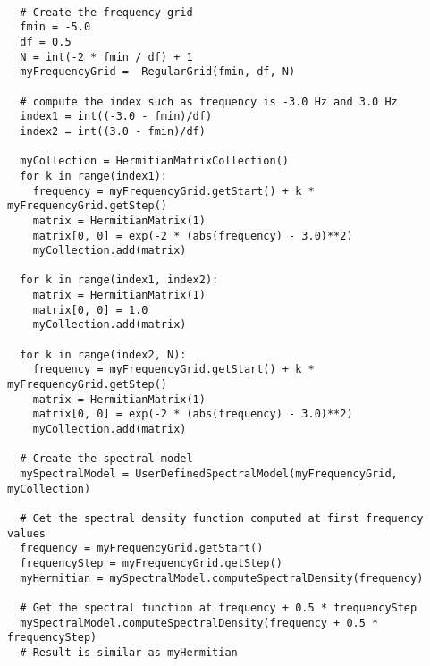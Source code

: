 \begin{lstlisting}

  # Create the frequency grid
  fmin = -5.0
  df = 0.5
  N = int(-2 * fmin / df) + 1
  myFrequencyGrid =  RegularGrid(fmin, df, N)

  # compute the index such as frequency is -3.0 Hz and 3.0 Hz
  index1 = int((-3.0 - fmin)/df)
  index2 = int((3.0 - fmin)/df)

  myCollection = HermitianMatrixCollection()
  for k in range(index1):
    frequency = myFrequencyGrid.getStart() + k * myFrequencyGrid.getStep()
    matrix = HermitianMatrix(1)
    matrix[0, 0] = exp(-2 * (abs(frequency) - 3.0)**2)
    myCollection.add(matrix)

  for k in range(index1, index2):
    matrix = HermitianMatrix(1)
    matrix[0, 0] = 1.0
    myCollection.add(matrix)

  for k in range(index2, N):
    frequency = myFrequencyGrid.getStart() + k * myFrequencyGrid.getStep()
    matrix = HermitianMatrix(1)
    matrix[0, 0] = exp(-2 * (abs(frequency) - 3.0)**2)
    myCollection.add(matrix)
      
  # Create the spectral model
  mySpectralModel = UserDefinedSpectralModel(myFrequencyGrid, myCollection)

  # Get the spectral density function computed at first frequency values
  frequency = myFrequencyGrid.getStart()
  frequencyStep = myFrequencyGrid.getStep()
  myHermitian = mySpectralModel.computeSpectralDensity(frequency)

  # Get the spectral function at frequency + 0.5 * frequencyStep
  mySpectralModel.computeSpectralDensity(frequency + 0.5 * frequencyStep)
  # Result is similar as myHermitian
 
\end{lstlisting}
